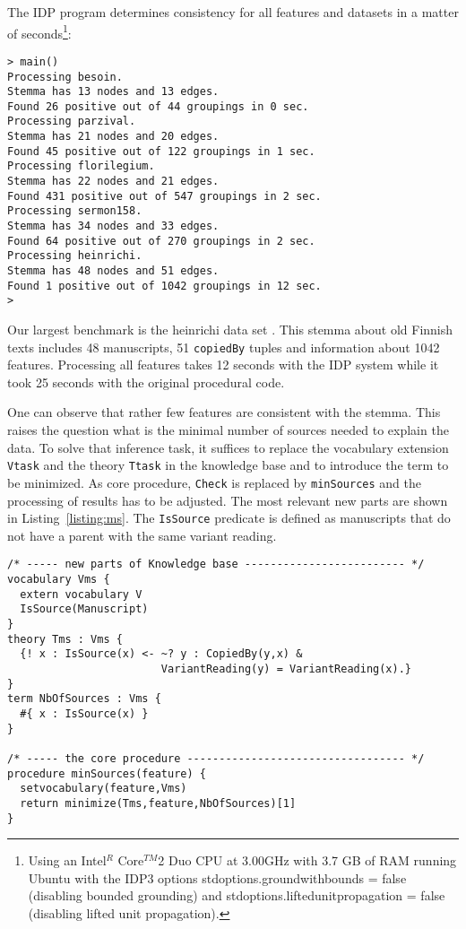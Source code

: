 \documentclass{tlp}
\newcommand{\idp}{{\sc IDP}\xspace}
\newcommand{\idpdrie}{{\sc IDP3}\xspace}
\renewcommand{\|}{\ensuremath{\,|\,}}
\renewcommand{\|}{\,|\,}
\begin{document}
The \idp program determines consistency for all features and datasets
in a matter of seconds\footnote{Using an Intel$^R$ Core$^{TM}$2 Duo
  CPU at 3.00GHz with 3.7 GB of RAM running Ubuntu with the \idpdrie
  options stdoptions.groundwithbounds = false (disabling bounded
  grounding) and stdoptions.liftedunitpropagation = false (disabling
  lifted unit propagation).}:





\begin{footnotesize}
\begin{verbatim}
> main()
Processing besoin.
Stemma has 13 nodes and 13 edges.
Found 26 positive out of 44 groupings in 0 sec.
Processing parzival.
Stemma has 21 nodes and 20 edges.
Found 45 positive out of 122 groupings in 1 sec.
Processing florilegium.
Stemma has 22 nodes and 21 edges.
Found 431 positive out of 547 groupings in 2 sec.
Processing sermon158.
Stemma has 34 nodes and 33 edges.
Found 64 positive out of 270 groupings in 2 sec.
Processing heinrichi.
Stemma has 48 nodes and 51 edges.
Found 1 positive out of 1042 groupings in 12 sec.
>
\end{verbatim}
\end{footnotesize}

Our largest benchmark is the  heinrichi
data set \cite{RoosH/09}. This stemma about old Finnish texts includes 48
manuscripts, 51 \texttt{copiedBy} tuples and information about 1042
features. Processing all features takes 12 seconds with the IDP system while
it took 25 seconds with the original procedural code.


One can observe that rather few features are consistent
with the stemma. This raises the question what is the minimal number
of sources needed to explain the data. To solve that inference task, it suffices to
replace the vocabulary extension \texttt{Vtask} and the theory
\texttt{Ttask} in the knowledge base and to introduce the term to
be minimized. As core procedure, \texttt{Check} is replaced by
\texttt{minSources} and the processing of results has to be
adjusted. The most relevant new parts are shown in
Listing~\ref{listing:ms}. The \texttt{IsSource} predicate is
defined as manuscripts that do not have a parent with the same variant
reading.

\begin{lstlisting}[caption={Minimize the number of sources.},label={listing:ms}]
/* ----- new parts of Knowledge base ------------------------- */
vocabulary Vms {
  extern vocabulary V
  IsSource(Manuscript)
}
theory Tms : Vms {
  {! x : IsSource(x) <- ~? y : CopiedBy(y,x) &
                        VariantReading(y) = VariantReading(x).}
}
term NbOfSources : Vms {
  #{ x : IsSource(x) }
}

/* ----- the core procedure ---------------------------------- */
procedure minSources(feature) {
  setvocabulary(feature,Vms)
  return minimize(Tms,feature,NbOfSources)[1]
}
\end{lstlisting}
\end{document}

